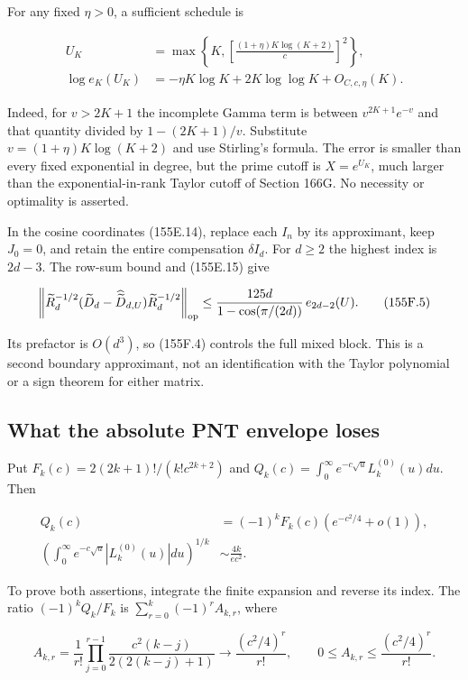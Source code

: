 \documentclass[
  11pt,
]{book}
\begin{document}
For any fixed \(\eta>0\), a sufficient schedule is

\[
\begin{aligned}
U_K&=\max\left\{K,\left[\frac{(1+\eta)K\log(K+2)}c\right]^2\right\},\\
\log e_K(U_K)&=-\eta K\log K+2K\log\log K+O_{C,c,\eta}(K).
\end{aligned}
\tag{155F.4}
\]

Indeed, for \(v>2K+1\) the incomplete Gamma term is between
\(v^{2K+1}e^{-v}\) and that quantity divided by \(1-(2K+1)/v\).
Substitute \(v=(1+\eta)K\log(K+2)\) and use Stirling's formula. The
error is smaller than every fixed exponential in degree, but the prime
cutoff is \(X=e^{U_K}\), much larger than the exponential-in-rank Taylor
cutoff of Section 166G. No necessity or optimality is asserted.

In the cosine coordinates (155E.14), replace each \(I_n\) by its
approximant, keep \(J_0=0\), and retain the entire compensation
\(\delta I_d\). For \(d\ge2\) the highest index is \(2d-3\). The row-sum
bound and (155E.15) give

\[
\left\|\widetilde R_d^{-1/2}
 (\widetilde D_d-\widehat{\widetilde D}_{d,U})
 \widetilde R_d^{-1/2}\right\|_{\rm op}
\le\frac{125d}{1-\cos(\pi/(2d))}\,e_{2d-2}(U).
\tag{155F.5}
\]

Its prefactor is \(O(d^3)\), so (155F.4) controls the full mixed block.
This is a second boundary approximant, not an identification with the
Taylor polynomial or a sign theorem for either matrix.

\subsection{What the absolute PNT envelope
loses}\label{what-the-absolute-pnt-envelope-loses}

Put \(F_k(c)=2(2k+1)!/(k!c^{2k+2})\) and
\(Q_k(c)=\int_0^\infty e^{-c\sqrt u}L_k^{(0)}(u)du\). Then

\[
\begin{aligned}
Q_k(c)&=(-1)^kF_k(c)(e^{-c^2/4}+o(1)),\\
\left(\int_0^\infty e^{-c\sqrt u}|L_k^{(0)}(u)|du\right)^{1/k}
&\sim\frac{4k}{ec^2}.
\end{aligned}
\tag{155F.6}
\]

To prove both assertions, integrate the finite expansion and reverse its
index. The ratio \((-1)^kQ_k/F_k\) is \(\sum_{r=0}^k(-1)^rA_{k,r}\),
where

\[
 A_{k,r}=\frac1{r!}\prod_{j=0}^{r-1}
 \frac{c^2(k-j)}{2(2(k-j)+1)}
 \longrightarrow\frac{(c^2/4)^r}{r!},\qquad
 0\le A_{k,r}\le\frac{(c^2/4)^r}{r!}.
\tag{155F.7}
\]
\end{document}
